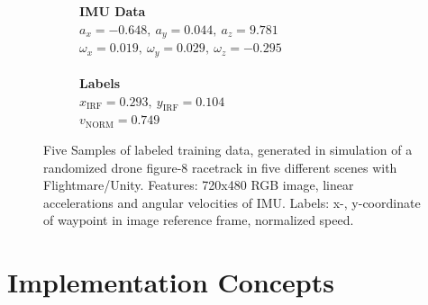 \begin{figure}[H]
\begin{subfigure}[b]{1.0\textwidth}
\begin{minipage}[c]{0.37\textwidth}
	  	\end{minipage}\hfill
	  	\begin{minipage}[c]{0.5\textwidth}
			\caption{
				\textbf{IMU Data}\\
				$a_x = -0.648,\ a_y = 0.044,\ a_z = 9.781$\\
				$\omega_x = 0.019,\ \omega_y = 0.029,\ \omega_z = -0.295$\\
				\\
				\textbf{Labels}\\
				$x_\text{IRF} = 0.293,\ y_\text{IRF} = 0.104$\\
				$v_\text{NORM} = 0.749$
				}  
	  	\end{minipage}
	\end{subfigure}

	\caption{Five Samples of labeled training data, generated in simulation of a randomized drone figure-8 racetrack in five different scenes with Flightmare/Unity. 
	Features: 720x480 RGB image, linear accelerations and angular velocities of IMU. Labels: x-, y-coordinate of waypoint in image reference frame, normalized speed.}
	\label{fig:three graphs}
\end{figure}



\section{Implementation Concepts}\label{sec:implConcept}


